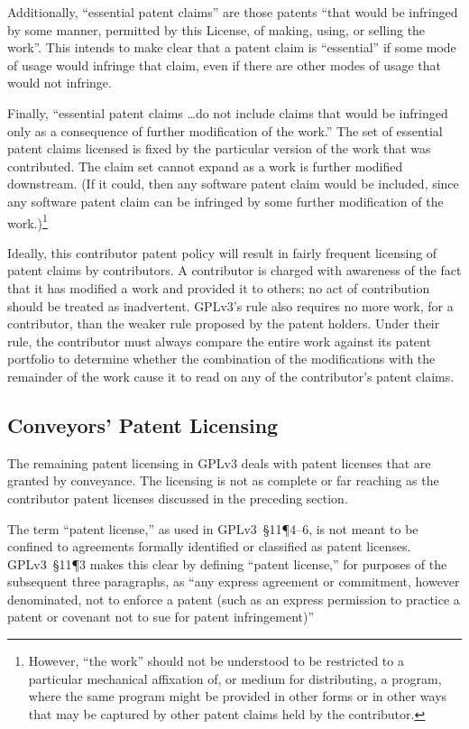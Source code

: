 Additionally, ``essential patent claims'' are those patents ``that would be
infringed by some manner, permitted by this License, of making, using, or
selling the work''.  This intends to make clear that a patent claim is
``essential'' if some mode of usage would infringe that claim, even if there
are other modes of usage that would not infringe.

Finally, ``essential patent claims \ldots do not include
claims that would be infringed only as a consequence of further
modification of the work.''  The set of essential patent
claims licensed  is fixed by the
particular version of the work that was contributed.  The claim set
cannot expand as a work is further modified downstream.  (If it could,
then any software patent claim would be included, since any software
patent claim can be infringed by some further modification of the
work.)\footnote{However, ``the work'' should not be understood to be
restricted to a particular mechanical affixation of, or medium for
distributing, a program, where the same program might be provided in
other forms or in other ways that may be captured by other patent claims
held by the contributor.}

\medskip

Ideally, this contributor patent policy will result in fairly frequent licensing of patent
claims by contributors.  A contributor is charged with awareness of the fact
that it has modified a work and provided it to others; no act of contribution
should be treated as inadvertent.  GPLv3's rule also requires no more work, for a
contributor, than the weaker rule proposed by the patent holders.  Under
their rule, the contributor must always compare the entire work against its
patent portfolio to determine whether the combination of the modifications
with the remainder of the work cause it to read on any of the contributor's
patent claims.

\subsection{Conveyors' Patent Licensing}

The remaining patent licensing in GPLv3 deals with patent licenses that are
granted by conveyance.  The licensing is not as complete or far reaching as
the contributor patent licenses discussed in the preceding section.

The term ``patent license,'' as used in GPLv3~\S11\P4--6, is not meant to be
confined to agreements formally identified or classified as patent licenses.
GPLv3~\S11\P3  makes this clear by defining ``patent
license,'' for purposes of the subsequent three paragraphs, as ``any express
agreement or commitment, however denominated, not to enforce a patent
(such as an express permission to practice a patent or covenant not to
sue for patent infringement)''

